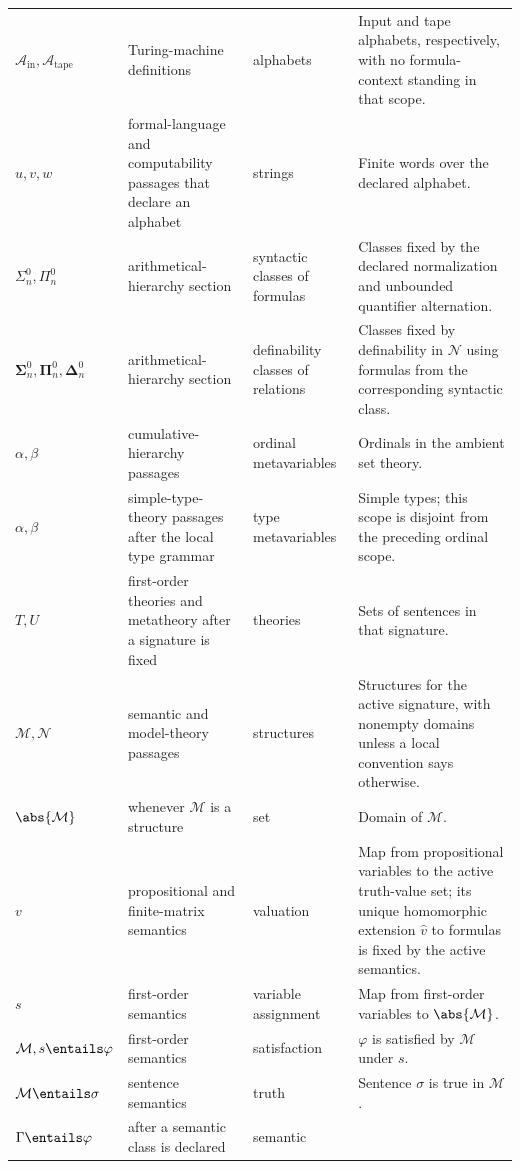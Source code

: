 \begin{longtable}{@{}p{}p{}p{}p{}@{}}
\(\mathcal A_{\mathrm{in}},\mathcal A_{\mathrm{tape}}\) & Turing-machine
definitions & alphabets & Input and tape alphabets, respectively, with no
formula-context standing in that scope. \\
\(u,v,w\) & formal-language and computability passages that declare an
alphabet & strings & Finite words over the declared alphabet. \\
\(\Sigma^0_n,\Pi^0_n\) & arithmetical-hierarchy section & syntactic classes
of formulas & Classes fixed by the declared normalization and unbounded
quantifier alternation. \\
\(\boldsymbol{\Sigma}^0_n,\boldsymbol{\Pi}^0_n,
\boldsymbol{\Delta}^0_n\) & arithmetical-hierarchy section & definability
classes of relations & Classes fixed by definability in \(\mathcal N\) using
formulas from the corresponding syntactic class. \\
\(\alpha,\beta\) & cumulative-hierarchy passages & ordinal metavariables &
Ordinals in the ambient set theory. \\
\(\alpha,\beta\) & simple-type-theory passages after the local type grammar &
type metavariables & Simple types; this scope is disjoint from the preceding
ordinal scope. \\
\(T,U\) & first-order theories and metatheory after a signature is fixed &
theories & Sets of sentences in that signature. \\
\(\mathcal M,\mathcal N\) & semantic and model-theory passages & structures &
Structures for the active signature, with nonempty domains unless a local
convention says otherwise. \\
\(\abs{\mathcal M}\) & whenever \(\mathcal M\) is a structure & set & Domain
of \(\mathcal M\). \\
\(v\) & propositional and finite-matrix semantics & valuation & Map from
propositional variables to the active truth-value set; its unique
homomorphic extension \(\widehat v\) to formulas is fixed by the active
semantics. \\
\(s\) & first-order semantics & variable assignment & Map from first-order
variables to \(\abs{\mathcal M}\). \\
\(\mathcal M,s\entails\varphi\) & first-order semantics & satisfaction &
\(\varphi\) is satisfied by \(\mathcal M\) under \(s\). \\
\(\mathcal M\entails\sigma\) & sentence semantics & truth & Sentence \(\sigma\)
is true in \(\mathcal M\). \\
\(\Gamma\entails\varphi\) & after a semantic class is declared & semantic

\end{longtable}
